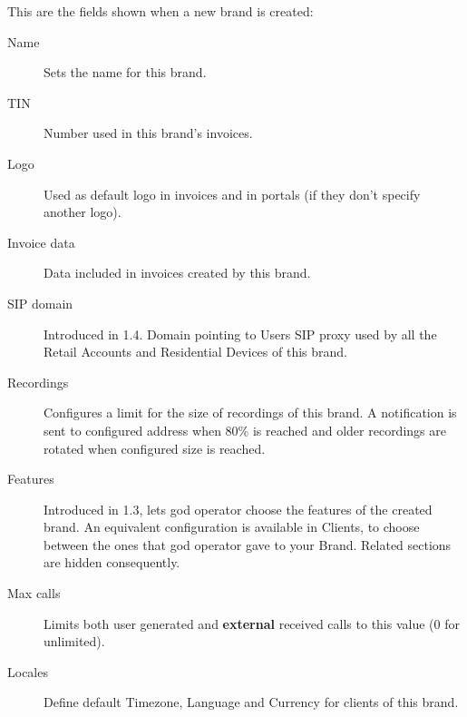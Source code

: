 \documentclass[letterpaper,10pt,english]{sphinxmanual}
\begin{document}
This are the fields shown when a new brand is created:
\begin{description}
\item[{Name}] \leavevmode{}\label{administration_portal/platform/brands:term-name}
Sets the name for this brand.

\item[{TIN}] \leavevmode{}\label{administration_portal/platform/brands:term-tin}
Number used in this brand's invoices.

\item[{Logo}] \leavevmode{}\label{administration_portal/platform/brands:term-logo}
Used as default logo in invoices and in portals (if they don't specify
another logo).

\item[{Invoice data}] \leavevmode{}\label{administration_portal/platform/brands:term-invoice-data}
Data included in invoices created by this brand.

\item[{SIP domain}] \leavevmode{}\label{administration_portal/platform/brands:term-sip-domain}
Introduced in 1.4. Domain pointing to Users SIP proxy used by all the
Retail Accounts and Residential Devices of this brand.

\item[{Recordings}] \leavevmode{}\label{administration_portal/platform/brands:term-recordings}
Configures a limit for the size of recordings of this brand. A
notification is sent to configured address when 80\% is reached and
older recordings are rotated when configured size is reached.

\item[{Features}] \leavevmode{}\label{administration_portal/platform/brands:term-features}
Introduced in 1.3, lets god operator choose the features of the created
brand. An equivalent configuration is available in Clients, to choose
between the ones that god operator gave to your Brand. Related sections
are hidden consequently.

\item[{Max calls}] \leavevmode{}\label{administration_portal/platform/brands:term-max-calls}
Limits both user generated and \textbf{external} received calls to this value
(0 for unlimited).

\item[{Locales}] \leavevmode{}\label{administration_portal/platform/brands:term-locales}
Define default Timezone, Language and Currency for clients of this brand.

\end{description}
\end{document}
